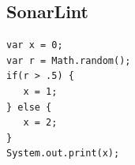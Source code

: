 \documentclass[
   aspectratio=169, %
   10pt, %
   uniqueslidenumber,
   handout,
   professionalfonts
]{beamer}
\begin{document}


\subsection{SonarLint}
\newsavebox\ExampleCodeCfG
\begin{lrbox}{\ExampleCodeCfG}
\begin{verbatim}
var x = 0;
var r = Math.random();
if(r > .5) {
   x = 1;
} else {
   x = 2;
}
System.out.print(x);
\end{verbatim}
\end{lrbox}
\end{document}
